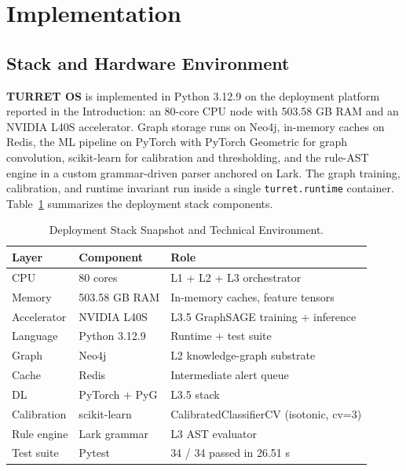 \section{Implementation}
\label{sec:implementation}

\subsection{Stack and Hardware Environment}

\textbf{TURRET OS} is implemented in Python 3.12.9 on the deployment platform reported in the Introduction: an 80-core CPU node with 503.58 GB RAM and an NVIDIA L40S accelerator. Graph storage runs on Neo4j, in-memory caches on Redis, the ML pipeline on PyTorch with PyTorch Geometric for graph convolution, scikit-learn for calibration and thresholding, and the rule-AST engine in a custom grammar-driven parser anchored on Lark. The graph training, calibration, and runtime invariant run inside a single \texttt{turret.runtime} container. Table~\ref{tab:deployment_stack} summarizes the deployment stack components.

\begin{table}[t!]
\caption{Deployment Stack Snapshot and Technical Environment.}
\label{tab:deployment_stack}
\centering
\footnotesize
\renewcommand{\arraystretch}{1.2}
\setlength{\tabcolsep}{8pt}
\begin{tabularx}{\textwidth}{l l X}
\toprule
\textbf{Layer} & \textbf{Component} & \textbf{Role} \\
\midrule
CPU & 80 cores & L1 + L2 + L3 orchestrator \\
Memory & 503.58 GB RAM & In-memory caches, feature tensors \\
Accelerator & NVIDIA L40S & L3.5 GraphSAGE training + inference \\
Language & Python 3.12.9 & Runtime + test suite \\
Graph & Neo4j & L2 knowledge-graph substrate \\
Cache & Redis & Intermediate alert queue \\
DL & PyTorch + PyG & L3.5 stack \\
Calibration & scikit-learn & CalibratedClassifierCV (isotonic, cv=3) \\
Rule engine & Lark grammar & L3 AST evaluator \\
Test suite & Pytest & 34 / 34 passed in 26.51 s \\
\bottomrule
\end{tabularx}
\end{table}


